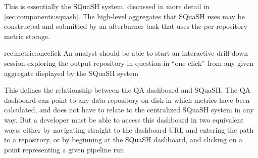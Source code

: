 This is essentially the SQuaSH system, discussed in more detail in \ref{sec:components:squash}.
The high-level aggregates that SQuaSH uses may be constructed and submitted by an afterburner task that uses the per-repository metric storage.

\begin{recommendation}
    {rec:metric:oneclick}
    {An analyst should be able to start an interactive drill-down session exploring the output repository in question in ``one click'' from any given aggregate displayed by the SQuaSH system}
\end{recommendation}

This defines the relationship between the QA dashboard and SQuaSH.
The QA dashboard can point to any data repository on disk in which metrics have been calculated, and does not have to relate to the centralized SQuaSH system in any way.
But a developer must be able to access this dashboard in two equivalent ways: either by navigating straight to the dashboard URL and entering the path to a repository, or by beginning at the SQuaSH dashboard, and clicking on a point representing a given pipeline run.
